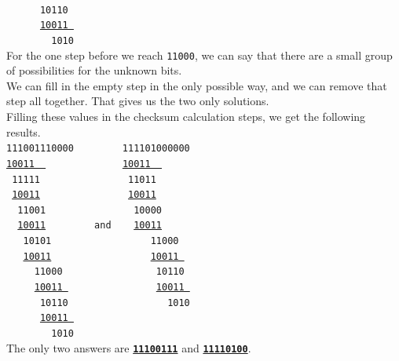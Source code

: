 \documentclass[twoside, a4paper, fleqn, reqno]{article}
\begin{document}
\begin{enumerate}
	\\\texttt{\phantom{}~~~~~~10\color{red}110~}
	\\\texttt{\phantom{}~~~~~~\underline{10\color{red}011~}}
	\\\texttt{\phantom{}~~~~~~~~\color{red}1010}
	\\For the one step before we reach \texttt{110\color{red}00}, we can say that there are a small
	group of possibilities for the unknown bits.
	\\We can fill in the empty step in the only possible way, and we can remove that step all together.
	That gives us the two only solutions.
	\\Filling these values in the checksum calculation steps, we get the following results.
	\\\texttt{\phantom{}11100111\color{red}0000~~~}					\texttt{\phantom{}~~~~~11110100\color{red}0000}
	\\\texttt{\phantom{}\underline{10011~~}~~~~~~~~}				\texttt{\phantom{}~~~~~\underline{10011~~}~~~~~}
	\\\texttt{\phantom{}~11111~~~~~~~~~}							\texttt{\phantom{}~~~~~~11011~~~~~~~~}
	\\\texttt{\phantom{}~\underline{10011}~~~~~~~~~}				\texttt{\phantom{}~~~~~~\underline{10011}~~~~~~~~}
	\\\texttt{\phantom{}~~11001~~~~~~~~}							\texttt{\phantom{}~~~~~~~10000~~~~~~}
	\\\texttt{\phantom{}~~\underline{10011}~~~~~~~~}				\texttt{\phantom{}and~~~~\underline{10011}~~~~~~}
	\\\texttt{\phantom{}~~~10101~~~~~~~}							\texttt{\phantom{}~~~~~~~~~~110\color{red}00~~}
	\\\texttt{\phantom{}~~~\underline{10011}~~~~~~~}				\texttt{\phantom{}~~~~~~~~~~\underline{100\color{red}11~}~}
	\\\texttt{\phantom{}~~~~~110\color{red}00~~~~~}					\texttt{\phantom{}~~~~~~~~~~~10\color{red}110~}
	\\\texttt{\phantom{}~~~~~\underline{100\color{red}11~}~~~~}		\texttt{\phantom{}~~~~~~~~~~~\underline{10\color{red}011~}}
	\\\texttt{\phantom{}~~~~~~10\color{red}110~~~~}					\texttt{\phantom{}~~~~~~~~~~~~~\color{red}1010}
	\\\texttt{\phantom{}~~~~~~\underline{10\color{red}011~}~~~}		
	\\\texttt{\phantom{}~~~~~~~~\color{red}1010~~~}					
	\\The only two answers are \textbf{\underline{\texttt{11100111}}} and \textbf{\underline{\texttt{11110100}}}. 

\end{enumerate}
\end{document}
